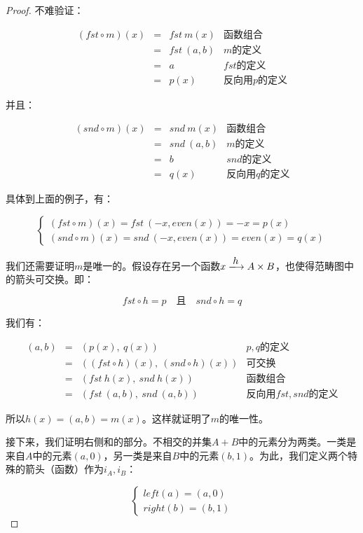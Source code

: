\documentclass[UTF8]{article}
\begin{document}
\begin{proof}
不难验证：

\[
\begin{array}{rcll}
(fst \circ m)(x) & = & fst\ m(x) & \text{函数组合} \\
                 & = & fst\ (a, b) & \text{$m$的定义} \\
                 & = & a & \text{$fst$的定义} \\
                 & = & p(x) & \text{反向用$p$的定义}
\end{array}
\]

并且：

\[
\begin{array}{rcll}
(snd \circ m)(x) & = & snd\ m(x) & \text{函数组合} \\
                 & = & snd\ (a, b) & \text{$m$的定义} \\
                 & = & b & \text{$snd$的定义} \\
                 & = & q(x) & \text{反向用$q$的定义}
\end{array}
\]

具体到上面的例子，有：

\[
\begin{cases}
(fst \circ m)(x) = fst\ (-x, even(x)) = -x = p(x) \\
(snd \circ m)(x) = snd\ (-x, even(x)) = even(x) = q(x)
\end{cases}
\]

我们还需要证明$m$是唯一的。假设存在另一个函数$x \arrowto{h} A \times B$，也使得范畴图中的箭头可交换。即：

\[
fst \circ h = p \quad \text{且} \quad snd \circ h = q
\]

我们有：

\[
\begin{array}{rcll}
(a, b) & = & (p(x),\ q(x)) & \text{$p, q$的定义} \\
       & = & ((fst \circ h)(x),\ (snd \circ h)(x)) & \text{可交换} \\
       & = & (fst\ h(x),\ snd\ h(x)) & \text{函数组合} \\
       & = & (fst\ (a, b),\ snd\ (a, b)) & \text{反向用$fst, snd$的定义}
\end{array}
\]

所以$h(x) = (a, b) = m(x)$。这样就证明了$m$的唯一性。

接下来，我们证明右侧和的部分。不相交的并集$A+B$中的元素分为两类。一类是来自$A$中的元素$(a, 0)$，另一类是来自$B$中的元素$(b, 1)$。为此，我们定义两个特殊的箭头（函数）作为$i_A, i_B$：

\[
\begin{cases}
left(a) = (a, 0) \\
right(b) = (b, 1)
\end{cases}
\]


\end{proof}
\end{document}

